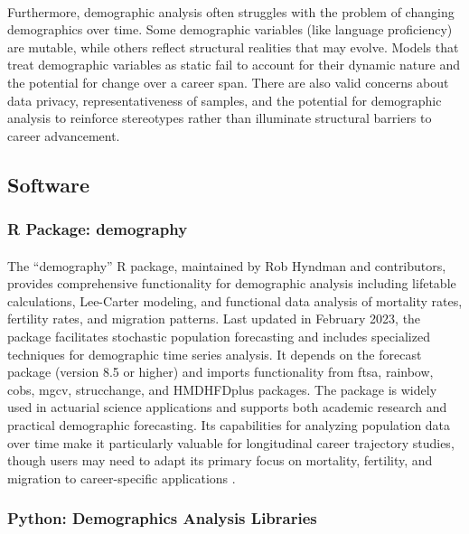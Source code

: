 \documentclass[../main.tex]{subfiles}
\begin{document}
\paragraph{} Furthermore, demographic analysis often struggles with the problem of changing demographics over time. Some demographic variables (like language proficiency) are mutable, while others reflect structural realities that may evolve. Models that treat demographic variables as static fail to account for their dynamic nature and the potential for change over a career span. There are also valid concerns about data privacy, representativeness of samples, and the potential for demographic analysis to reinforce stereotypes rather than illuminate structural barriers to career advancement.

\subsection{Software}

\subsubsection{R Package: demography}
\paragraph{} The ``demography'' R package, maintained by Rob Hyndman and contributors, provides comprehensive functionality for demographic analysis including lifetable calculations, Lee-Carter modeling, and functional data analysis of mortality rates, fertility rates, and migration patterns. Last updated in February 2023, the package facilitates stochastic population forecasting and includes specialized techniques for demographic time series analysis. It depends on the forecast package (version 8.5 or higher) and imports functionality from ftsa, rainbow, cobs, mgcv, strucchange, and HMDHFDplus packages. The package is widely used in actuarial science applications and supports both academic research and practical demographic forecasting. Its capabilities for analyzing population data over time make it particularly valuable for longitudinal career trajectory studies, though users may need to adapt its primary focus on mortality, fertility, and migration to career-specific applications \citep{hyndman2023demography}.

\subsubsection{Python: Demographics Analysis Libraries}
\end{document}
